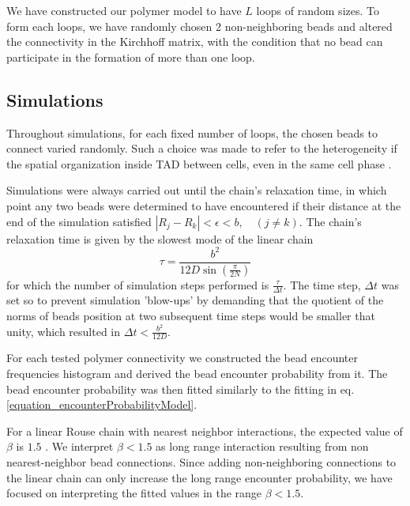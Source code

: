 \documentclass[12pt]{paper}
\begin{document}
We have constructed our polymer model to have $L$ loops of random sizes. To form each loops, we have randomly chosen 2 non-neighboring beads and altered the connectivity in the Kirchhoff matrix, with the condition that no bead can participate in the formation of more than one loop. 

\subsection{Simulations}\label{subsection_simulations}
Throughout simulations, for each fixed number of loops, the chosen beads to connect varied randomly. Such a choice was made to refer to the heterogeneity if the spatial organization inside TAD between cells, even in the same cell phase \cite{Nora2012}.

Simulations were always carried out until the chain's relaxation time, in which point any two beads were determined to have encountered if their distance at the end of the simulation satisfied $|R_j-R_k|<\epsilon<b,\quad  (j\ne k)$. 
The chain's relaxation time is given by the slowest mode of the linear chain 
\begin{equation*}
\tau =\frac{b^2}{12D\sin(\frac{\pi}{2N})} 
\end{equation*}  
for which the number of simulation steps performed is $\frac{\tau}{\Delta t} $. The time step, $\Delta t$ was set so to prevent simulation 'blow-ups' by demanding that the quotient of the norms of beads position at two subsequent time steps would be smaller that unity, which resulted in $\Delta t < \frac{b^2}{12D}$. 

For each tested polymer connectivity we constructed the bead encounter frequencies histogram and derived the bead encounter probability from it. The bead encounter probability was then fitted similarly to the fitting in eq. \ref{equation_encounterProbabilityModel}. 

For a linear Rouse chain with nearest neighbor interactions, the expected value of $\beta$ is $1.5$ \cite{doi1986theory}. We interpret $\beta<1.5$ as long range interaction resulting from non nearest-neighbor bead connections.
Since adding non-neighboring connections to the linear chain can only increase the long range encounter probability, we have focused on interpreting the fitted values in the range $\beta<1.5$. 
\end{document}
